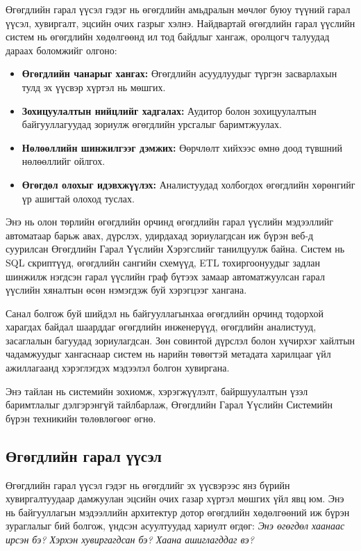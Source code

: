Өгөгдлийн гарал үүсэл гэдэг нь өгөгдлийн амьдралын мөчлөг буюу түүний гарал үүсэл, хувиргалт, эцсийн очих газрыг хэлнэ. Найдвартай өгөгдлийн гарал үүслийн систем нь өгөгдлийн хөдөлгөөнд ил тод байдлыг хангаж, оролцогч талуудад дараах боломжийг олгоно:

\begin{itemize}
    \item \textbf{Өгөгдлийн чанарыг хангах:} Өгөгдлийн асуудлуудыг түргэн засварлахын тулд эх үүсвэр хүртэл нь мөшгих.
    \item \textbf{Зохицуулалтын нийцлийг хадгалах:} Аудитор болон зохицуулалтын байгууллагуудад зориулж өгөгдлийн урсгалыг баримтжуулах.
    \item \textbf{Нөлөөллийн шинжилгээг дэмжих:} Өөрчлөлт хийхээс өмнө доод түвшний нөлөөллийг ойлгох.
    \item \textbf{Өгөгдөл олохыг идэвхжүүлэх:} Аналистуудад холбогдох өгөгдлийн хөрөнгийг үр ашигтай олоход туслах.
\end{itemize}

Энэ нь олон төрлийн өгөгдлийн орчинд өгөгдлийн гарал үүслийн мэдээллийг автоматаар барьж авах, дүрслэх, удирдахад зориулагдсан иж бүрэн веб-д суурилсан Өгөгдлийн Гарал Үүслийн Хэрэгслийг танилцуулж байна. Систем нь SQL скриптүүд, өгөгдлийн сангийн схемүүд, ETL тохиргоонуудыг задлан шинжилж нэгдсэн гарал үүслийн граф бүтээх замаар автоматжуулсан гарал үүслийн хяналтын өсөн нэмэгдэж буй хэрэгцээг хангана.

Санал болгож буй шийдэл нь байгууллагынхаа өгөгдлийн орчинд тодорхой харагдах байдал шаарддаг өгөгдлийн инженерүүд, өгөгдлийн аналистууд, засаглалын багуудад зориулагдсан. Зөн совинтой дүрслэл болон хүчирхэг хайлтын чадамжуудыг хангаснаар систем нь нарийн төвөгтэй метадата харилцааг үйл ажиллагаанд хэрэглэгдэх мэдээлэл болгон хувиргана.

Энэ тайлан нь системийн зохиомж, хэрэгжүүлэлт, байршуулалтын үзэл баримтлалыг дэлгэрэнгүй тайлбарлаж, Өгөгдлийн Гарал Үүслийн Системийн бүрэн техникийн төлөвлөгөөг өгнө.

\subsection{Өгөгдлийн гарал үүсэл}
\label{subsec:data_lineage_concept}

Өгөгдлийн гарал үүсэл гэдэг нь өгөгдлийг эх үүсвэрээс янз бүрийн хувиргалтуудаар дамжуулан эцсийн очих газар хүртэл мөшгих үйл явц юм. Энэ нь байгууллагын мэдээллийн архитектур дотор өгөгдлийн хөдөлгөөний иж бүрэн зураглалыг бий болгож, үндсэн асуултуудад хариулт өгдөг: \textit{Энэ өгөгдөл хаанаас ирсэн бэ? Хэрхэн хувиргагдсан бэ? Хаана ашиглагддаг вэ?}


